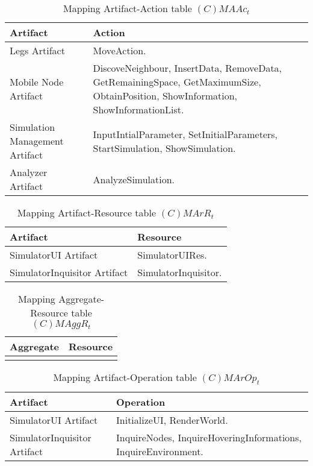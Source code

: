 \begin{table}[H]
	\centering
	\begin{tabular}{|p{4cm}|p{8cm}|}
			\hline
			\textbf{Artifact} & \textbf{Action} \\
			\hline
			Legs Artifact & MoveAction. \\
			\hline
			Mobile Node Artifact & DiscoveNeighbour, InsertData, RemoveData,
			GetRemainingSpace, GetMaximumSize, ObtainPosition, ShowInformation,
			ShowInformationList. \\
			\hline
			Simulation Management Artifact & InputIntialParameter,
			SetInitialParameters, StartSimulation, ShowSimulation. \\
			\hline
			Analyzer Artifact & AnalyzeSimulation. \\
			\hline
		\end{tabular}
	\caption{Mapping Artifact-Action table $(C)MAAc_t$}
	\label{tab:cmaact}
\end{table}

\begin{table}[H]
	\centering
	\begin{tabular}{|p{4cm}|p{8cm}|}
			\hline
			\textbf{Artifact} & \textbf{Resource} \\
			\hline
			SimulatorUI Artifact & SimulatorUIRes. \\
			\hline
			SimulatorInquisitor Artifact & SimulatorInquisitor. \\
			\hline
		\end{tabular}
	\caption{Mapping Artifact-Resource table $(C)MArR_t$}
	\label{tab:cmarrt}
\end{table}

\begin{table}[H]
	\centering
	\begin{tabular}{|p{4cm}|p{8cm}|}
			\hline
			\textbf{Aggregate} & \textbf{Resource} \\
			\hline
			& \\
			\hline
		\end{tabular}
	\caption{Mapping Aggregate-Resource table $(C)MAggR_t$}
	\label{tab:cmaggrt}
\end{table}

\begin{table}[H]
	\centering
	\begin{tabular}{|p{4cm}|p{8cm}|}
			\hline
			\textbf{Artifact} & \textbf{Operation} \\
			\hline
			SimulatorUI Artifact & InitializeUI, RenderWorld. \\
			\hline
			SimulatorInquisitor Artifact & InquireNodes, InquireHoveringInformations,
			InquireEnvironment. \\
			\hline
		\end{tabular}
	\caption{Mapping Artifact-Operation table $(C)MArOp_t$}
	\label{tab:cmaropt}
\end{table}

